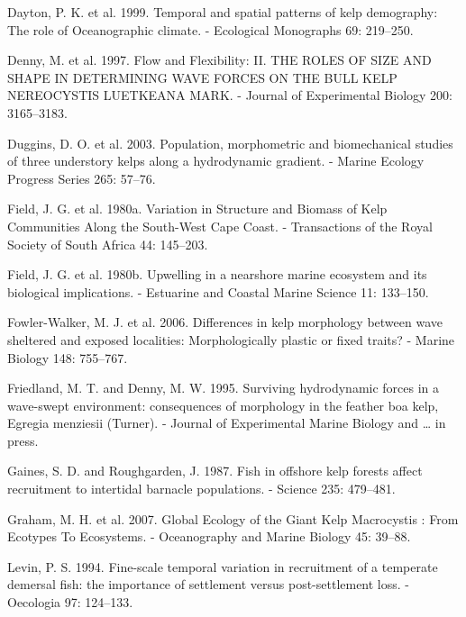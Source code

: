 \documentclass[10pt,a4,]{article}
\begin{document}
\leavevmode\hypertarget{ref-Dayton1999}{}%
Dayton, P. K. et al. 1999. Temporal and spatial patterns of kelp
demography: The role of Oceanographic climate. - Ecological Monographs
69: 219--250.

\leavevmode\hypertarget{ref-Denny1997}{}%
Denny, M. et al. 1997. Flow and Flexibility: II. THE ROLES OF SIZE AND
SHAPE IN DETERMINING WAVE FORCES ON THE BULL KELP NEREOCYSTIS LUETKEANA
MARK. - Journal of Experimental Biology 200: 3165--3183.

\leavevmode\hypertarget{ref-Duggins2003}{}%
Duggins, D. O. et al. 2003. Population, morphometric and biomechanical
studies of three understory kelps along a hydrodynamic gradient. -
Marine Ecology Progress Series 265: 57--76.

\leavevmode\hypertarget{ref-Field1980b}{}%
Field, J. G. et al. 1980a. Variation in Structure and Biomass of Kelp
Communities Along the South-West Cape Coast. - Transactions of the Royal
Society of South Africa 44: 145--203.

\leavevmode\hypertarget{ref-Field1980a}{}%
Field, J. G. et al. 1980b. Upwelling in a nearshore marine ecosystem and
its biological implications. - Estuarine and Coastal Marine Science 11:
133--150.

\leavevmode\hypertarget{ref-FowlerWalker2006}{}%
Fowler-Walker, M. J. et al. 2006. Differences in kelp morphology between
wave sheltered and exposed localities: Morphologically plastic or fixed
traits? - Marine Biology 148: 755--767.

\leavevmode\hypertarget{ref-Friedland1995}{}%
Friedland, M. T. and Denny, M. W. 1995. Surviving hydrodynamic forces in
a wave-swept environment: consequences of morphology in the feather boa
kelp, Egregia menziesii (Turner). - Journal of Experimental Marine
Biology and \ldots{} in press.

\leavevmode\hypertarget{ref-Gaines1987}{}%
Gaines, S. D. and Roughgarden, J. 1987. Fish in offshore kelp forests
affect recruitment to intertidal barnacle populations. - Science 235:
479--481.

\leavevmode\hypertarget{ref-Graham2007}{}%
Graham, M. H. et al. 2007. Global Ecology of the Giant Kelp Macrocystis
: From Ecotypes To Ecosystems. - Oceanography and Marine Biology 45:
39--88.

\leavevmode\hypertarget{ref-Levin1994}{}%
Levin, P. S. 1994. Fine-scale temporal variation in recruitment of a
temperate demersal fish: the importance of settlement versus
post-settlement loss. - Oecologia 97: 124--133.
\end{document}
